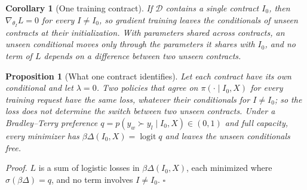 \documentclass[letterpaper]{article} %
\newtheorem{proposition}{Proposition}
\newtheorem{corollary}{Corollary}
\begin{document}
\begin{corollary}[One training contract]
If $\mathcal{D}$ contains a single contract $I_0$, then $\nabla_{\theta_I} L = 0$ for every $I \neq I_0$, so gradient training leaves the conditionals of unseen contracts at their initialization. With parameters shared across contracts, an unseen conditional moves only through the parameters it shares with $I_0$, and no term of $L$ depends on a difference between two unseen contracts.
\end{corollary}
\begin{proposition}[What one contract identifies]
Let each contract have its own conditional and let $\lambda=0$. Two policies that agree on $\pi(\cdot\mid I_0,X)$ for every training request have the same loss, whatever their conditionals for $I\neq I_0$; so the loss does not determine the switch between two unseen contracts. Under a Bradley--Terry preference $q=p(y_w\succ y_l\mid I_0,X)\in(0,1)$ and full capacity, every minimizer has $\beta\Delta(I_0,X)=\operatorname{logit}q$ and leaves the unseen conditionals free.
\end{proposition}
\noindent\textit{Proof.} $L$ is a sum of logistic losses in $\beta\Delta(I_0,X)$, each minimized where $\sigma(\beta\Delta)=q$, and no term involves $I\neq I_0$. $\square$
\end{document}

